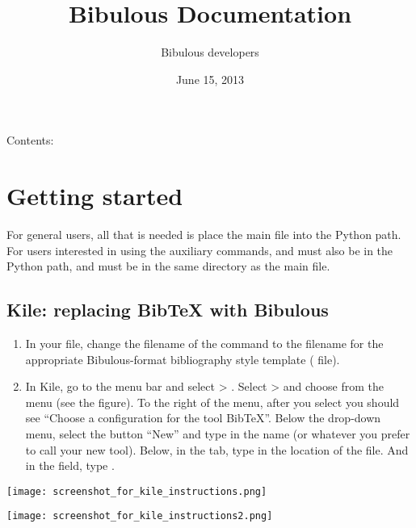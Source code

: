 \documentclass[letterpaper,10pt,english]{sphinxmanual}
\title{Bibulous Documentation}
\date{June 15, 2013}
\author{Bibulous developers}
\begin{document}
\maketitle
\tableofcontents
{}\label{index::doc}


Contents:


\chapter{Getting started}
\label{getting_started:bibulous-documentation}\label{getting_started:getting-started}\label{getting_started::doc}
For general users, all that is needed is place the main  file into the Python path. For users interested in using the auxiliary commands,  and  must also be in the Python path, and must be in the same directory as the main file.


\section{Kile: replacing BibTeX with Bibulous}
\label{getting_started:kile-replacing-bibtex-with-bibulous}\begin{enumerate}
\item {} 
In your  file, change the filename of the  command to the filename for the appropriate Bibulous-format bibliography style template ( file).

\item {} 
In Kile, go to the menu bar and select  \textgreater{} . Select  \textgreater{}  and choose  from the  menu (see the figure). To the right of the menu, after you select  you should see ``Choose a configuration for the tool BibTeX''. Below the drop-down menu, select the button ``New'' and type in the name  (or whatever you prefer to call your new tool). Below, in the  tab, type in the location of the  file. And in the  field, type .

\end{enumerate}

\texttt{[image: screenshot\_for\_kile\_instructions.png]}

\texttt{[image: screenshot\_for\_kile\_instructions2.png]}
\end{document}
